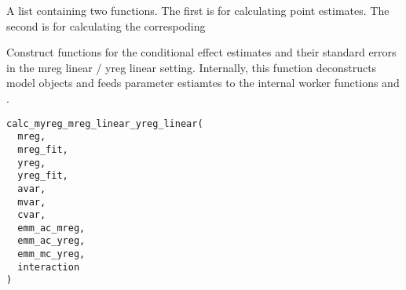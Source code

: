 \documentclass[a4paper]{book}
\begin{document}
%
\begin{Value}
A list containing two functions. The first is for calculating point estimates. The second is for calculating the correspoding
\end{Value}
%
\begin{Description}
Construct functions for the conditional effect estimates and their standard errors in the mreg linear / yreg linear setting. Internally, this function deconstructs model objects and feeds parameter estiamtes to the internal worker functions  and .
\end{Description}
%
\begin{Usage}
\begin{verbatim}
calc_myreg_mreg_linear_yreg_linear(
  mreg,
  mreg_fit,
  yreg,
  yreg_fit,
  avar,
  mvar,
  cvar,
  emm_ac_mreg,
  emm_ac_yreg,
  emm_mc_yreg,
  interaction
)
\end{verbatim}
\end{Usage}
%
\end{document}
